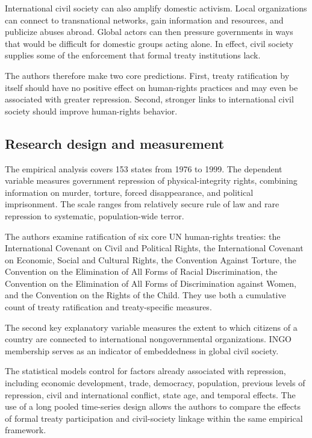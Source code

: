 International civil society can also amplify domestic activism. Local organizations can connect to transnational networks, gain information and resources, and publicize abuses abroad. Global actors can then pressure governments in ways that would be difficult for domestic groups acting alone. In effect, civil society supplies some of the enforcement that formal treaty institutions lack.

The authors therefore make two core predictions. First, treaty ratification by itself should have no positive effect on human-rights practices and may even be associated with greater repression. Second, stronger links to international civil society should improve human-rights behavior.

\subsection{Research design and measurement}

The empirical analysis covers 153 states from 1976 to 1999. The dependent variable measures government repression of physical-integrity rights, combining information on murder, torture, forced disappearance, and political imprisonment. The scale ranges from relatively secure rule of law and rare repression to systematic, population-wide terror.

The authors examine ratification of six core UN human-rights treaties: the International Covenant on Civil and Political Rights, the International Covenant on Economic, Social and Cultural Rights, the Convention Against Torture, the Convention on the Elimination of All Forms of Racial Discrimination, the Convention on the Elimination of All Forms of Discrimination against Women, and the Convention on the Rights of the Child. They use both a cumulative count of treaty ratification and treaty-specific measures.

The second key explanatory variable measures the extent to which citizens of a country are connected to international nongovernmental organizations. INGO membership serves as an indicator of embeddedness in global civil society.

The statistical models control for factors already associated with repression, including economic development, trade, democracy, population, previous levels of repression, civil and international conflict, state age, and temporal effects. The use of a long pooled time-series design allows the authors to compare the effects of formal treaty participation and civil-society linkage within the same empirical framework.

